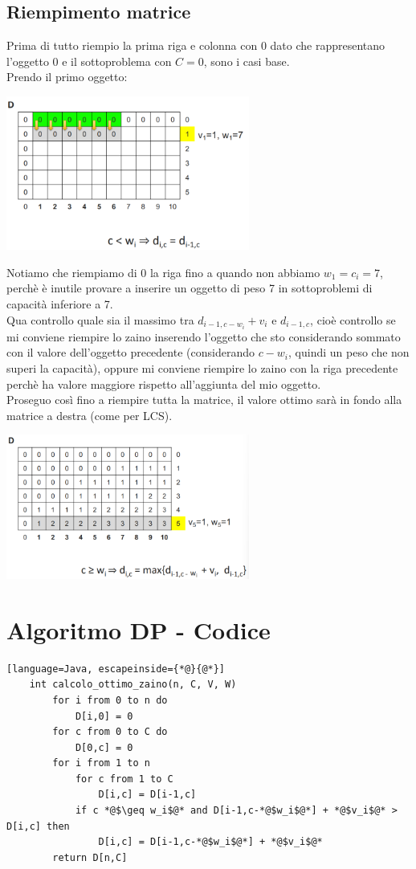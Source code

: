 \subsection{Riempimento matrice}
Prima di tutto riempio la prima riga e colonna con 0 dato che rappresentano l'oggetto 0 e il
sottoproblema con $C=0$, sono i casi base.\\
Prendo il primo oggetto:
\begin{center}
    \includegraphics[width=80mm,scale=0.5]{chapters_ulerich/img/knapsack_matrix_filling_v1.png}
\end{center}
Notiamo che riempiamo di 0 la riga fino a quando non abbiamo $w_1 = c_i = 7$, perchè è inutile
provare a inserire un oggetto di peso 7 in sottoproblemi di capacità inferiore a 7.\\
Qua controllo quale sia il massimo tra $d_{i-1,c-w_i} + v_i$ e $d_{i-1,c}$, cioè controllo se mi
conviene riempire lo zaino inserendo l'oggetto che sto considerando sommato con il valore dell'oggetto
precedente (considerando $c-w_i$, quindi un peso che non superi la capacità), oppure mi conviene riempire lo
zaino con la riga precedente perchè ha valore maggiore rispetto all'aggiunta del mio oggetto.\\
Proseguo così fino a riempire tutta la matrice, il valore ottimo sarà in fondo alla matrice a destra (come per LCS).
\begin{center}
    \includegraphics[width=80mm,scale=0.5]{chapters_ulerich/img/knapsack_matrix_filled.png}
\end{center}
\section{Algoritmo DP - Codice}
\begin{lstlisting}[language=Java, escapeinside={*@}{@*}]
    int calcolo_ottimo_zaino(n, C, V, W)
        for i from 0 to n do
            D[i,0] = 0
        for c from 0 to C do
            D[0,c] = 0
        for i from 1 to n
            for c from 1 to C
                D[i,c] = D[i-1,c]
            if c *@$\geq w_i$@* and D[i-1,c-*@$w_i$@*] + *@$v_i$@* > D[i,c] then
                D[i,c] = D[i-1,c-*@$w_i$@*] + *@$v_i$@*
        return D[n,C] 
\end{lstlisting}
